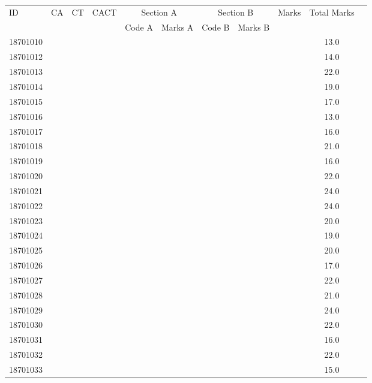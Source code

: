 \documentclass[12pt]{article}
\begin{document}
    \begin{center} 
	\renewcommand{\arraystretch}{1.08}
	\begin{small}
    \begin{tabular}{|l|c|c|c|c|c|c|c|c|c|c|} \hline
	\multirow{2}{*}{ID} & 	\multirow{2}{*}{CA}  & 	\multirow{2}{*}{CT}  & 	\multirow{2}{*}{CACT}  & \multicolumn{2 }{|c|}{Section A}& \multicolumn{2 }{c|}{Section B} & 	\multirow{2}{*}{Marks}  & 	\multirow{2}{*}{Total Marks}  \\ 
	&  &  &  & Code A & Marks A & Code B & Marks B&  &  \\ \hline
18701010 &  &  &  &  &  &  &  &  & 13.0\\ \hline 
18701012 &  &  &  &  &  &  &  &  & 14.0\\ \hline 
18701013 &  &  &  &  &  &  &  &  & 22.0\\ \hline 
18701014 &  &  &  &  &  &  &  &  & 19.0\\ \hline 
18701015 &  &  &  &  &  &  &  &  & 17.0\\ \hline 
18701016 &  &  &  &  &  &  &  &  & 13.0\\ \hline 
18701017 &  &  &  &  &  &  &  &  & 16.0\\ \hline 
18701018 &  &  &  &  &  &  &  &  & 21.0\\ \hline 
18701019 &  &  &  &  &  &  &  &  & 16.0\\ \hline 
18701020 &  &  &  &  &  &  &  &  & 22.0\\ \hline 
18701021 &  &  &  &  &  &  &  &  & 24.0\\ \hline 
18701022 &  &  &  &  &  &  &  &  & 24.0\\ \hline 
18701023 &  &  &  &  &  &  &  &  & 20.0\\ \hline 
18701024 &  &  &  &  &  &  &  &  & 19.0\\ \hline 
18701025 &  &  &  &  &  &  &  &  & 20.0\\ \hline 
18701026 &  &  &  &  &  &  &  &  & 17.0\\ \hline 
18701027 &  &  &  &  &  &  &  &  & 22.0\\ \hline 
18701028 &  &  &  &  &  &  &  &  & 21.0\\ \hline 
18701029 &  &  &  &  &  &  &  &  & 24.0\\ \hline 
18701030 &  &  &  &  &  &  &  &  & 22.0\\ \hline 
18701031 &  &  &  &  &  &  &  &  & 16.0\\ \hline 
18701032 &  &  &  &  &  &  &  &  & 22.0\\ \hline 
18701033 &  &  &  &  &  &  &  &  & 15.0\\ \hline 

\end{tabular}
\end{small}
\end{center}
\end{document}
